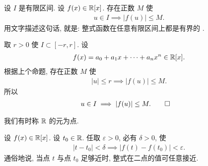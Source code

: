 \begin{proposition}
    设 $I$ 是有限区间. 设 $f(x) \in \mathbb{R}[x]$. 存在正数 $M$ 使
    \begin{align*}
        u \in I \implies |f(u)| \leq M.
    \end{align*}
    用文字描述这句话, 就是: 整式函数在任意有限区间上都是有界的 .
\end{proposition}

\begin{pf}
    取 $r > 0$ 使 $I \subset [-r, r]$. 设
    \begin{align*}
        f(x) = a_0 + a_1 x + \cdots + a_n x^n \in \mathbb{R}[x].
    \end{align*}
    根据上个命题, 存在正数 $M$ 使
    \begin{align*}
        |u| \leq r \implies |f(u)| \leq M.
    \end{align*}
    所以
    \begin{align*}
         & u \in I \implies |f(u)| \leq M. \qedhere
    \end{align*}
\end{pf}

我们有时称 $\mathbb{R}$ 的元为点.

\begin{proposition}
    设 $f(x) \in \mathbb{R}[x]$. 设 $t_0 \in \mathbb{R}$. 任取 $\varepsilon > 0$, 必有 $\delta > 0$, 使
    \begin{align*}
        |t - t_0| < \delta \implies |f(t) - f(t_0)| < \varepsilon.
    \end{align*}
    通俗地说, 当点 $t$ 与点 $t_0$ 足够近时, 整式在二点的值可任意接近.
\end{proposition}

